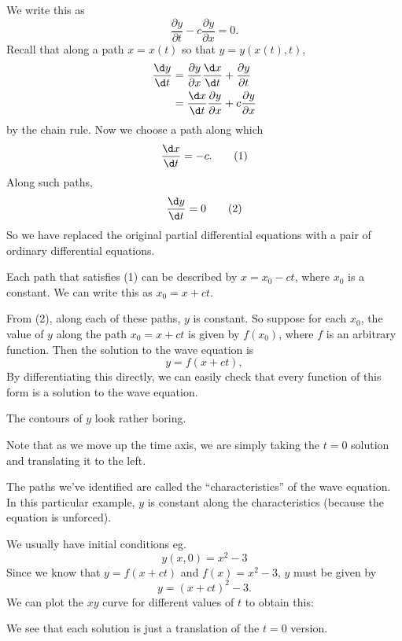 \documentclass[a4paper]{article}
\begin{document}
We write this as
\[
  \frac{\partial y}{\partial t} - c\frac{\partial y}{\partial x} = 0.
\]
Recall that along a path $x = x(t)$ so that $y = y(x(t), t)$,
\begin{align*}
  \frac{\d y}{\d t} &= \frac{\partial y}{\partial x}\frac{\d x}{\d t} + \frac{\partial y}{\partial t}\\
  &= \frac{\d x}{\d t}\frac{\partial y}{\partial x} + c\frac{\partial y}{\partial x}
\end{align*}
by the chain rule. Now we choose a path along which
\[
  \frac{\d x}{\d t} = -c. \tag{1}
\]
Along such paths,
\[
  \frac{\d y}{\d t} = 0 \tag{2}
\]
So we have replaced the original partial differential equations with a pair of ordinary differential equations.

Each path that satisfies (1) can be described by $x = x_0 - ct$, where $x_0$ is a constant. We can write this as $x_0 = x + ct$.

From (2), along each of these paths, $y$ is constant. So suppose for each $x_0$, the value of $y$ along the path $x_0 = x + ct$ is given by $f(x_0)$, where $f$ is an arbitrary function. Then the solution to the wave equation is
\[
  y = f(x + ct),
\]
By differentiating this directly, we can easily check that every function of this form is a solution to the wave equation.

The contours of $y$ look rather boring.
\begin{center}
\end{center}
Note that as we move up the time axis, we are simply taking the $t = 0$ solution and translating it to the left.

The paths we've identified are called the ``characteristics'' of the wave equation. In this particular example, $y$ is constant along the characteristics (because the equation is unforced).

We usually have initial conditions eg.
\[
  y(x, 0) = x^2 - 3
\]
Since we know that $y = f(x + ct)$ and $f(x) = x^2 - 3$, $y$ must be given by
\[
  y = (x + ct)^2 - 3.
\]
We can plot the $xy$ curve for different values of $t$ to obtain this:
\begin{center}
\end{center}
We see that each solution is just a translation of the $t = 0$ version.
\end{document}
